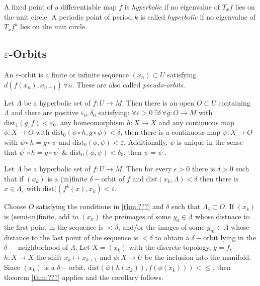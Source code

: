 \indent A fixed point of a differentiable map $f$ is \textit{hyperbolic} if no eigenvalue of $T_xf$ lies on the unit circle. A periodic point of period $k$ is called \textit{hyperbolic} if no eigenvalue of $T_x f^k$ lies on the unit circle.

\subsection{$\varepsilon$-Orbits}

\indent An $\varepsilon$-orbit is a finite or infinite sequence $(x_n) \subset U$ satisfying $d(f(x_n),x_{n+1}) \hspace{2pt} \forall n$. These are also called \textit{pseudo-orbits}.

\begin{thm}\label{thm:???}
Let $\Lambda$ be a hyperbolic set of $f:U \to M$. Then there is an open $O \subset U$ containing $\Lambda$ and there are positive $\varepsilon_0,\delta_0$ satisfying: $\forall \varepsilon > 0 \hspace{2pt} \exists \delta \hspace{2pt}\forall g: O \to M$ with $\mathrm{dist}_1(g,f)< \varepsilon_0$, any homeomorphism $h: X \to X$ and any continuous map $\phi: X \to O$ with $\mathrm{dist}_0(\phi \circ h, g \circ \phi) < \delta $, then there is a continuous map $\psi: X \to O$ with $\psi \circ h = g \circ \psi$ and $\mathrm{dist}_0(\phi,\psi)< \varepsilon$. Additionally, $\psi$ is unique in the sense that $\psi^{\prime} \circ h = g \circ \psi^{\prime}$ \& $\mathrm{dist}_0(\phi,\psi) < \delta_0$, then $\psi=\psi^{\prime}$.
\end{thm}

\begin{cor}

Let $\Lambda$ be a hyperbolic set of $f:U \to M$. Then for every $\epsilon>0$ there is $\delta>0$ such that if $(x_k)$ is a (in)finite $\delta-$orbit of $f$ and $\mathrm{dist}(x_k,\Lambda) < \delta$ then there is $x \in \Lambda_{\varepsilon}$ with $\mathrm{dist}((f^k(x),x_k) < \varepsilon$.

\end{cor}

\begin{pf}

Choose $O$ satisfying the conditions in \ref{thm:???} and $\delta$ such that $\Lambda_{\delta} \subset O$. If $(x_k)$ is (semi-in)finite, add to $(x_k)$ the preimages of some $y_0 \in \Lambda$ whose distnace to the first point in the sequence is $< \delta$, and/or the images of some $y_m \in \Lambda$ whose distance to the last point of the sequence is $< \delta$ to obtain a $\delta-$orbit lying in the $\delta-$ neighborhood of $\Lambda$. Let $X = (x_k)$ with the discrete topology, $g=f$, $h:X \to X$ the shift $x_k \mapsto x_{k+1}$ and $\phi: X \to U$ be the inclusion into the manifold. Since $(x_k)$ is a $\delta-$orbit, $\mathrm{dist}(\phi(h(x_k)),f(\phi(x_k))) < \leq$, then theorem \ref{thm:???} applies and the corollary follows.

\end{pf}

